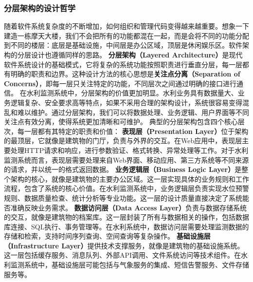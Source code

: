 \subsubsection{分层架构的设计哲学}\label{ux5206ux5c42ux67b6ux6784ux7684ux8bbeux8ba1ux54f2ux5b66}
随着软件系统复杂度的不断增加，如何组织和管理代码变得越来越重要。想象一下建造一栋摩天大楼，我们不会把所有的功能都混在一起，而是会将不同的功能分配到不同的楼层：底层是基础设施，中间层是办公区域，顶层是休闲娱乐区。软件架构的分层设计也遵循同样的思路。
\textbf{分层架构（Layered Architecture）}是现代软件系统设计的基础模式，它将复杂的系统功能按照职责进行垂直分层，每一层都有明确的职责和边界。这种设计方法的核心思想是\textbf{关注点分离（Separation
of Concerns）}，即每一层只关注特定的功能，不同层次之间通过明确的接口进行通信。
在水利监测系统中，分层架构的价值更加明显。水利业务具有数据量大、业务逻辑复杂、安全要求高等特点，如果不采用合理的架构设计，系统很容易变得混乱和难以维护。通过分层架构，我们可以将数据处理、业务逻辑、用户界面等不同关注点有效分离，使得系统更加清晰和可维护。
典型的分层架构包含四个核心层次，每一层都有其特定的职责和价值： \textbf{表现层（Presentation
Layer）}位于架构的最顶层，它就像是建筑物的门厅，负责与外界的交互。在Web应用中，表现层主要处理HTTP请求和响应，进行参数验证、格式转换、异常处理等工作。对于水利监测系统而言，表现层需要处理来自Web界面、移动应用、第三方系统等不同来源的请求，并以统一的格式返回数据。
\textbf{业务逻辑层（Business Logic
Layer）}是整个架构的核心，就像是建筑物的主要办公区域。这一层实现具体的业务规则和工作流程，包含了系统的核心价值。在水利监测系统中，业务逻辑层负责实现水位预警规则、数据质量检查、统计分析等专业功能。这一层的设计质量直接决定了系统能否准确反映业务需求。
\textbf{数据访问层（Data Access
Layer）}负责与数据存储系统的交互，就像是建筑物的档案库。这一层封装了所有与数据相关的操作，包括数据库连接、SQL执行、事务管理等。在水利系统中，数据访问层需要处理监测数据的存储和检索，支持时间序列查询、空间查询等复杂操作。
\textbf{基础设施层（Infrastructure
Layer）}提供技术支撑服务，就像是建筑物的基础设施系统。这一层包括缓存服务、消息队列、外部API调用、文件系统访问等技术组件。在水利监测系统中，基础设施层可能包括与气象服务的集成、短信告警服务、文件存储服务等。
